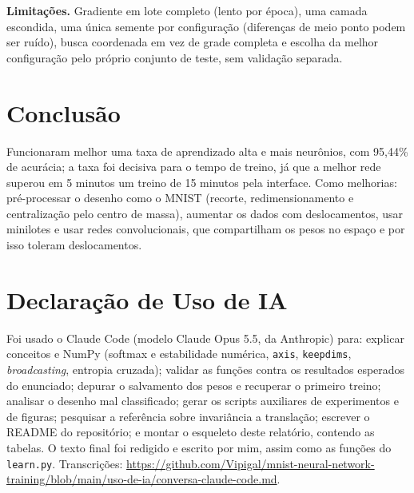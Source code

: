 \documentclass[letterpaper]{article} %
\begin{document}
\textbf{Limitações.} Gradiente em lote completo (lento por época), uma camada escondida, uma única semente por configuração (diferenças de meio ponto podem ser ruído), busca coordenada em vez de grade completa e escolha da melhor configuração pelo próprio conjunto de teste, sem validação separada.

\section{Conclusão}
Funcionaram melhor uma taxa de aprendizado alta e mais neurônios, com 95,44\% de acurácia; a taxa foi decisiva para o tempo de treino, já que a melhor rede superou em 5 minutos um treino de 15 minutos pela interface. Como melhorias: pré-processar o desenho como o MNIST (recorte, redimensionamento e centralização pelo centro de massa), aumentar os dados com deslocamentos, usar minilotes e usar redes convolucionais, que compartilham os pesos no espaço e por isso toleram deslocamentos.

\section{Declaração de Uso de IA}
Foi usado o Claude Code (modelo Claude Opus 5.5, da Anthropic) para: explicar conceitos e NumPy (softmax e estabilidade numérica, \texttt{axis}, \texttt{keepdims}, \emph{broadcasting}, entropia cruzada); validar as funções contra os resultados esperados do enunciado; depurar o salvamento dos pesos e recuperar o primeiro treino; analisar o desenho mal classificado; gerar os scripts auxiliares de experimentos e de figuras; pesquisar a referência sobre invariância a translação; escrever o README do repositório; e montar o esqueleto deste relatório, contendo as tabelas. O texto final foi redigido e escrito por mim, assim como as funções do \texttt{learn.py}. Transcrições: \url{https://github.com/Vipigal/mnist-neural-network-training/blob/main/uso-de-ia/conversa-claude-code.md}.


\end{document}
